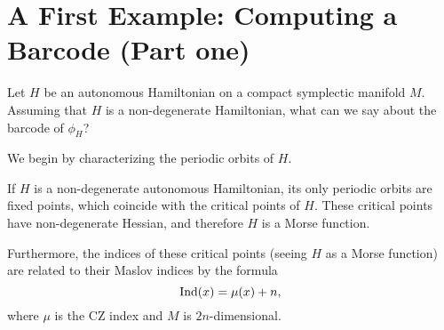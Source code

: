 \section{A First Example: Computing a Barcode (Part one)}\label{subsecautonomous}

Let $H$ be an autonomous Hamiltonian on a compact symplectic manifold $M$. Assuming that $H$ is a non-degenerate Hamiltonian, what can we say about the barcode of $\phi_H$?

We begin by characterizing the periodic orbits of $H$.

\begin{prop}\label{authamfloermorse}
If $H$ is a non-degenerate autonomous Hamiltonian, its only periodic orbits are fixed points, which coincide with the critical points of $H$. These critical points have non-degenerate Hessian, and therefore $H$ is a Morse function.

Furthermore, the indices of these critical points (seeing $H$ as a Morse function) are related to their Maslov indices by the formula
\begin{equation}
\operatorname{Ind}(x) = \mu(x) + n,
\end{equation}
where $\mu$ is the CZ index and $M$ is $2n$-dimensional.
\end{prop}

